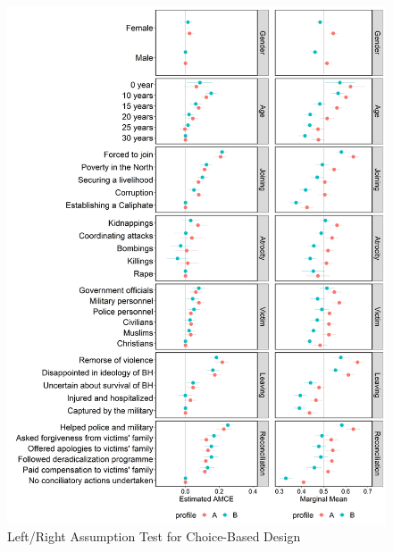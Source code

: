 \newpage
\vspace{3mm}
\begin{figure}[H]
\includegraphics[width=\textwidth]{Appendices/Appendix_chapter_3/art2-app-figure7.jpeg}
\caption{Left/Right Assumption Test for Choice-Based Design}
\label{fig:art2-app-fig6}    
\end{figure}

